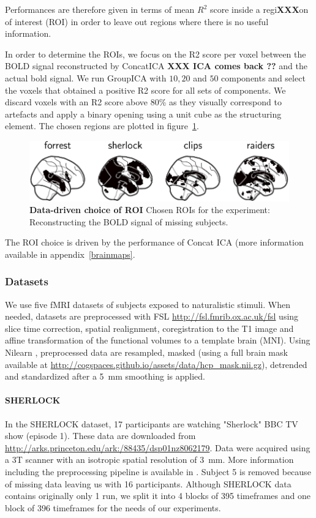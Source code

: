 Performances are therefore given in terms of mean $R^2$ score inside a regi\textbf{XXX}on of interest (ROI)
in order to leave out regions where there is no useful information.

In order to determine the ROIs, we focus on the R2 score per voxel between the BOLD signal reconstructed by ConcatICA \textbf{XXX ICA comes back ??} and the actual bold signal. We run GroupICA with $10, 20$ and $50$ components and select the voxels that obtained a positive R2 score for all sets of components.
% 
We discard voxels with an R2 score above 80\% as they visually correspond to artefacts and apply a binary opening using a unit cube as the structuring element. The chosen regions are plotted in figure~\ref{fig:roi}.

\begin{figure}
  \centering
  \includegraphics[width=\textwidth]{figures/mvica/reconstruction_score_roi.pdf}
  \caption{\textbf{Data-driven choice of ROI} Chosen ROIs for the experiment: Reconstructing the BOLD signal of missing subjects.}
  \label{fig:roi}
\end{figure}

The ROI choice is driven by the performance of Concat ICA (more information
available in appendix~\ref{brainmaps}.
\subsubsection{Datasets}

We use five fMRI datasets of subjects exposed to naturalistic stimuli. When needed, datasets are preprocessed with FSL \url{http://fsl.fmrib.ox.ac.uk/fsl} using slice time correction, spatial realignment, coregistration to the T1 image and affine transformation of the functional volumes to a template brain (MNI). Using Nilearn \cite{abraham2014machine}, preprocessed data are resampled, masked (using a full brain mask available at \url{http://cogspaces.github.io/assets/data/hcp_mask.nii.gz}), detrended and standardized after a 5 mm smoothing is applied.  
%
\paragraph{SHERLOCK}
In the SHERLOCK dataset, 17 participants are watching "Sherlock" BBC TV show (episode 1). 
%
These data are downloaded from \url{http://arks.princeton.edu/ark:/88435/dsp01nz8062179}. 
%
Data were acquired using a 3T scanner with an isotropic spatial resolution of 3 mm. 
%
More information including the preprocessing pipeline is available in \cite{sherlock}.
%
Subject 5 is removed because of missing data leaving us with 16 participants.
%
Although SHERLOCK data contains originally only 1 run, we split it into 4 blocks of 395 timeframes and one block of 396 timeframes for the needs of our experiments. 


